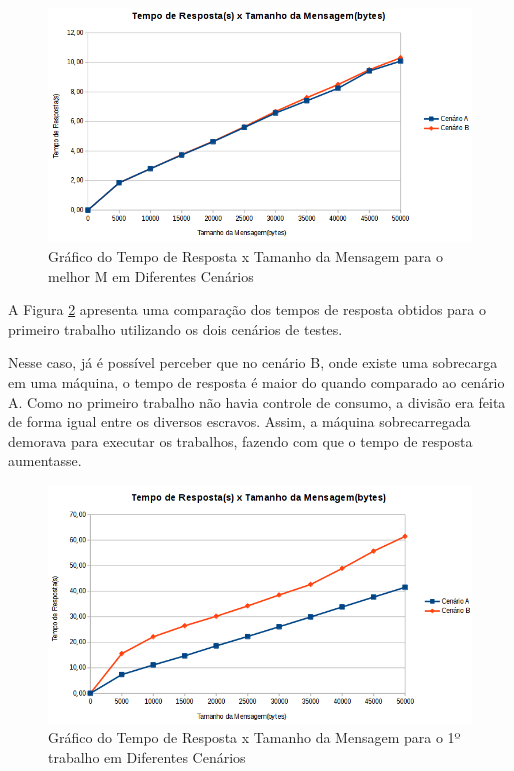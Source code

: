 \documentclass[
	12pt,				%
    oneside,			%
	a4paper,			%
	english,			%
	brazil,				%
	]{abntex2}
\begin{document}
\begin{figure}[!htb]
\centering
\includegraphics[scale=0.7]{figuras/T2_AxB.png}
\caption{Gráfico do Tempo de Resposta x Tamanho da Mensagem para o melhor M em Diferentes Cenários}
\label{fig:tempo_respostaXtamanho_msg_T2_AxB}
\end{figure}

A Figura \ref{fig:tempo_respostaXtamanho_msg_T1_AxB} apresenta uma comparação dos tempos de resposta obtidos para o primeiro trabalho utilizando os dois cenários de testes.

Nesse caso, já é possível perceber que no cenário B, onde existe uma sobrecarga em uma máquina, o tempo de resposta é maior do quando comparado ao cenário A. Como no primeiro trabalho não havia controle de consumo, a divisão era feita de forma igual entre os diversos escravos. Assim, a máquina sobrecarregada demorava para executar os trabalhos, fazendo com que o tempo de resposta aumentasse.

\begin{figure}[!htb]
\centering
\includegraphics[scale=0.7]{figuras/T1_AxB.png}
\caption{Gráfico do Tempo de Resposta x Tamanho da Mensagem para o 1º trabalho em Diferentes Cenários}
\label{fig:tempo_respostaXtamanho_msg_T1_AxB}
\end{figure}
\end{document}
